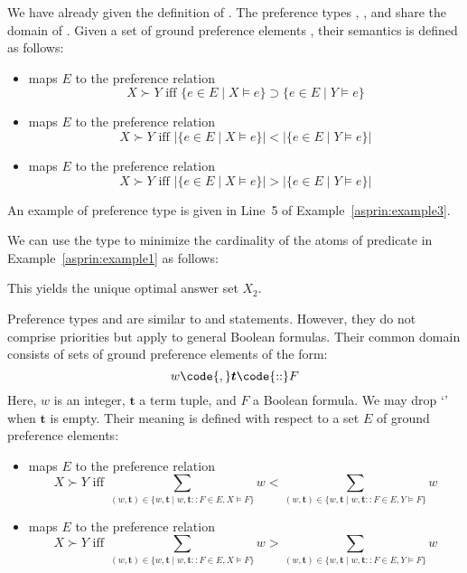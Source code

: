 We have already given the definition of . 
The preference types , , and  share the domain of .
Given a set of ground preference elements ,
their semantics is defined as follows:
\begin{itemize}
\item
{} maps $E$ to the preference relation
\[
X \succ Y \text{ iff } \{e\in E\mid X\models e\}\supset\{e\in E\mid Y\models e\}
\]
\item
{} maps $E$ to the preference relation
\[
X \succ Y \text{ iff } \left|\{e\in E\mid X\models e\}\right|<\left|\{e\in E\mid Y\models e\}\right|
\]
\item
{} maps $E$ to the preference relation
\[
X \succ Y \text{ iff } \left|\{e\in E\mid X\models e\}\right|>\left|\{e\in E\mid Y\models e\}\right|
\]
\end{itemize}
An example of preference type  is given in Line~5 of Example~\ref{asprin:example3}.
%
\begin{example}
%
%
We can use the type  to minimize the cardinality of the atoms of predicate 
in Example~\ref{asprin:example1} as follows:
%

%
This yields the unique optimal answer set $X_2$.
\end{example}

Preference types  and 
are similar to  and  statements.
However, they do not comprise priorities but apply to general Boolean formulas.
Their common domain consists of sets of ground preference elements of the form:
\[w\code{,}\boldsymbol{t}\code{::}F\]
Here, ${w}$ is an integer, $\boldsymbol{t}$ a term tuple, and $F$ a Boolean formula.
%
We may drop `\code{,}' when $\boldsymbol{t}$ is empty.
%
Their meaning is defined with respect to a set $E$ of ground preference elements:
\begin{itemize}
\item
{} maps $E$ to the preference relation
\[
X \succ Y 
\text{ iff }
\sum_{(w,\boldsymbol{t})\in\{w,\boldsymbol{t}\mid w,\boldsymbol{t}\mathtt{::}F\in E, X\models F\}}w
<
\sum_{(w,\boldsymbol{t})\in\{w,\boldsymbol{t}\mid w,\boldsymbol{t}\mathtt{::}F\in E, Y\models F\}}w
\]
\item
{} maps $E$ to the preference relation
\[
X \succ Y 
\text{ iff }
\sum_{(w,\boldsymbol{t})\in\{w,\boldsymbol{t}\mid w,\boldsymbol{t}\mathtt{::}F\in E, X\models F\}}w
>
\sum_{(w,\boldsymbol{t})\in\{w,\boldsymbol{t}\mid w,\boldsymbol{t}\mathtt{::}F\in E, Y\models F\}}w
\]
\end{itemize}

